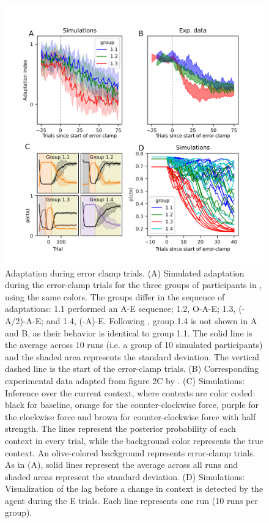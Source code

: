 \documentclass[a4paper,doc,floatsintext,natbib]{apa6}
\begin{document}
\begin{figure}
\centering
\includegraphics[width=\textwidth]{./figures/figure_4.png}
\caption{Adaptation during error clamp trials. (A) Simulated adaptation during the error-clamp trials for the three groups of participants in \cite{Vaswani_Decay_2013}, using the same colors. The groups differ in the sequence of adaptations: 1.1 performed an A-E sequence; 1.2, O-A-E; 1.3, (-A/2)-A-E; and 1.4, (-A)-E. Following \cite{Vaswani_Decay_2013}, group 1.4 is not shown in A and B, as their behavior is identical to group 1.1. The solid line is the average across 10 runs (i.e. a group of 10 simulated participants) and the shaded area represents the standard deviation. The vertical dashed line is the start of the error-clamp trials. (B) Corresponding experimental data adapted from figure 2C by \cite{Vaswani_Decay_2013}. (C) Simulations: Inference over the current context, where contexts are color coded: black for baseline, orange for the counter-clockwise force, purple for the clockwise force and brown for counter-clockwise force with half strength. The lines represent the posterior probability of each context in every trial, while the background color represents the true context. An olive-colored background represents error-clamp trials. As in (A), solid lines represent the average across all runs and shaded areas represent the standard deviation. (D) Simulations: Visualization of the lag before a change in context is detected by the agent during the E trials. Each line represents one run (10 runs per group).}
\label{fig:vaswani-2013}
\end{figure}
\end{document}
